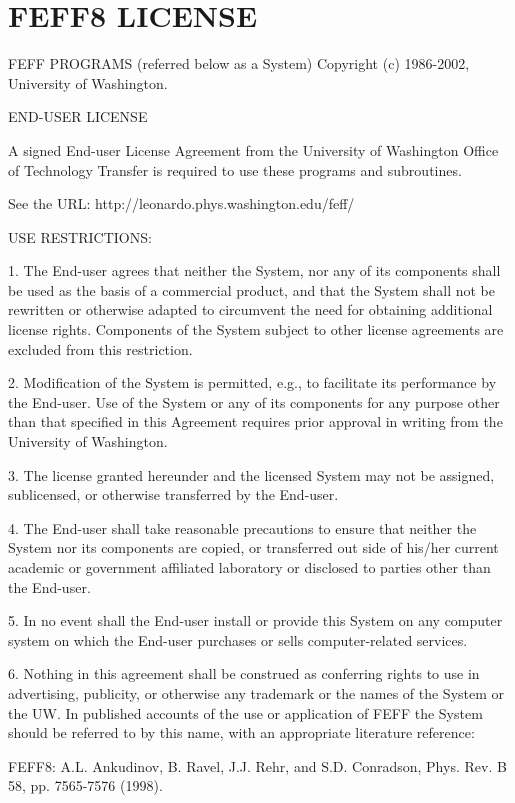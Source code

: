 \documentclass[11pt,oneside]{report} %
\begin{document}
\section{FEFF8 LICENSE}
\label{sec:F8license}

 FEFF PROGRAMS (referred below as a System)
 Copyright (c) 1986-2002, University of Washington.

 END-USER LICENSE

 A signed End-user License Agreement from the University of Washington
 Office of Technology Transfer is required to use these programs and
 subroutines.

 See the URL: http://leonardo.phys.washington.edu/feff/

 USE RESTRICTIONS:

 1. The End-user agrees that neither the System, nor any of its
 components shall be used as the basis of a commercial product, and
 that the System shall not be rewritten or otherwise adapted to
 circumvent the need for obtaining additional license rights.
 Components of the System subject to other license agreements are
 excluded from this restriction.

 2. Modification of the System is permitted, e.g., to facilitate
 its performance by the End-user. Use of the System or any of its
 components for any purpose other than that specified in this Agreement
 requires prior approval in writing from the University of Washington.

 3. The license granted hereunder and the licensed System may not be
 assigned, sublicensed, or otherwise transferred by the End-user.

 4. The End-user shall take reasonable precautions to ensure that
 neither the System nor its components are copied, or transferred out
 side of his/her current academic or government affiliated laboratory
 or disclosed to parties other than the End-user.

 5. In no event shall the End-user install or provide this System
 on any computer system on which the End-user purchases or sells
 computer-related services.

 6. Nothing in this agreement shall be construed as conferring rights
 to use in advertising, publicity, or otherwise any trademark or the
 names of the System or the UW.   In published accounts of the use or
 application of FEFF the System should be referred to  by this name,
 with an appropriate literature reference:

 FEFF8: A.L. Ankudinov, B. Ravel, J.J. Rehr, and S.D. Conradson,
        Phys. Rev. B 58, pp. 7565-7576 (1998).
\end{document}
